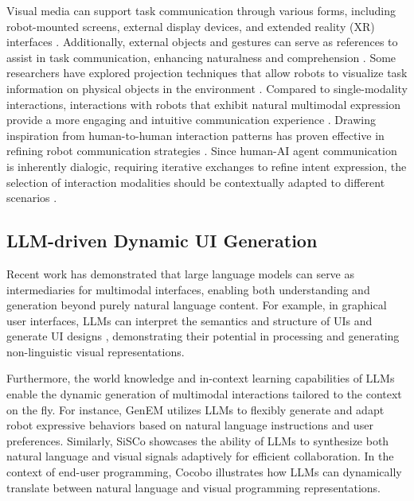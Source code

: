 Visual media can support task communication through various forms, including robot-mounted screens, external display devices, and extended reality (XR) interfaces \cite{carriero_human-robot_2023,maccio_mixed_2022,carriero_human-robot_2023}. Additionally, external objects and gestures can serve as references to assist in task communication, enhancing naturalness and comprehension \cite{huang_gestures_2024, higger_toward_2023}. 
Some researchers have explored projection techniques that allow robots to visualize task information on physical objects in the environment \cite{andersen_projecting_2016}. 
Compared to single-modality interactions, interactions with robots that exhibit natural multimodal expression provide a more engaging and intuitive communication experience \cite{breazeal_social_2016}. 
Drawing inspiration from human-to-human interaction patterns has proven effective in refining robot communication strategies \cite{huang_gestures_2024}. Since human-AI agent communication is inherently dialogic, requiring iterative exchanges to refine intent expression, the selection of interaction modalities should be contextually adapted to different scenarios \cite{glassman_designing_2023}.





\subsection{LLM-driven Dynamic UI Generation}

Recent work has demonstrated that large language models can serve as intermediaries for multimodal interfaces, enabling both understanding and generation beyond purely natural language content. For example, in graphical user interfaces, LLMs can interpret the semantics and structure of UIs \cite{you_ferret-ui_2024,duan_towards_2023} and generate UI designs \cite{lu_ui_2023,kargaran_menucraft_2023}, demonstrating their potential in processing and generating non-linguistic visual representations.

Furthermore, the world knowledge and in-context learning capabilities of LLMs \cite{zhao_survey_2024} enable the dynamic generation of multimodal interactions tailored to the context on the fly. For instance, GenEM \cite{mahadevan_generative_2024} utilizes LLMs to flexibly generate and adapt robot expressive behaviors based on natural language instructions and user preferences. Similarly, SiSCo \cite{sonawani_sisco_2024} showcases the ability of LLMs to synthesize both natural language and visual signals adaptively for efficient collaboration. In the context of end-user programming, Cocobo \cite{ge_cocobo_2024} illustrates how LLMs can dynamically translate between natural language and visual programming representations.


